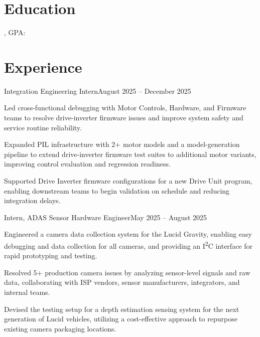 \section*{Education}

\edu{\eduSchoolFull}{\myLocation}
    {\eduDegreeFull, GPA: \eduGpa}{\eduDatesFull}


\section*{Experience}

    {Integration Engineering Intern}{August 2025 -- December 2025}
\begin{bullets}
  \item Led cross-functional debugging with Motor Controls, Hardware, and Firmware teams to resolve drive-inverter firmware issues and improve system safety and service routine reliability.
  \item Expanded PIL infrastructure with 2+ motor models and a model-generation pipeline to extend drive-inverter firmware test suites to additional motor variants, improving control evaluation and regression readiness.
  \item Supported Drive Inverter firmware configurations for a new Drive Unit program, enabling downstream teams to begin validation on schedule and reducing integration delays.
\end{bullets}

    {Intern, ADAS Sensor Hardware Engineer}{May 2025 -- August 2025}
\begin{bullets}
  \item Engineered a camera data collection system for the Lucid Gravity, enabling easy debugging and data collection for all cameras, and providing an I\textsuperscript{2}C interface for rapid prototyping and testing.
  \item Resolved 5+ production camera issues by analyzing sensor-level signals and raw data, collaborating with ISP vendors, sensor manufacturers, integrators, and internal teams.
  \item Devised the testing setup for a depth estimation sensing system for the next generation of Lucid vehicles, utilizing a cost-effective approach to repurpose existing camera packaging locations.
\end{bullets}

